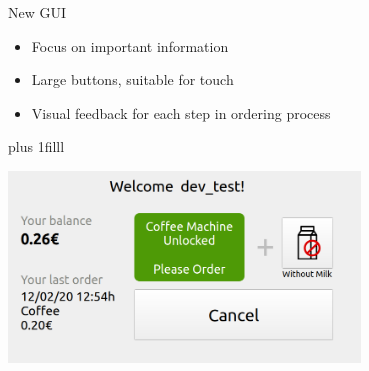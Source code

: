 \documentclass[t]{beamer}
\newcommand{\btVFill}{\vskip0pt plus 1filll}
\begin{document}
\begin{frame}{New GUI}
    \begin{itemize}
        \item Focus on important information
        \item Large buttons, suitable for touch
        \item Visual feedback for each step in ordering process
    \end{itemize}
    \btVFill
    \begin{center}
        \includegraphics[width=0.7\textwidth]{../thesis/images/gui-new-1.png}
    \end{center}
\end{frame}
\end{document}

